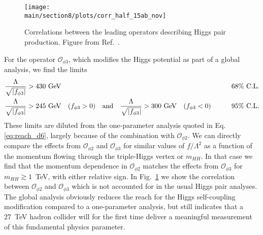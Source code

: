 \begin{figure}[t!]
\centering
\texttt{[image: \\main/section8/plots/corr\_half\_15ab\_nov]}
\caption{Correlations between the leading operators describing Higgs
  pair production. Figure from Ref.~\cite{Biekotter:2018jzu}.}
\label{fig:corr}
\end{figure}
For the operator $\mathcal{O}_{\phi 3}$, which modifies the Higgs potential
as part of a global analysis, we find the limits
%
\begin{alignat}{9}
\frac{\Lambda}{\sqrt{|f_{\phi 3}|}} &> 430~\text{GeV}
&\qquad \text{68\% C.L.} \notag \\
\frac{\Lambda}{\sqrt{|f_{\phi 3}|}} &> 245~\text{GeV}
\quad (f_{\phi 3} >0)
\quad \text{and} \quad 
\frac{\Lambda}{\sqrt{|f_{\phi 3}|}} > 300~\text{GeV}
\quad (f_{\phi 3} <0) 
&\qquad \text{95\% C.L.} 
\label{eq:reach_d6_3}
\end{alignat}
%
These limits are diluted from the one-parameter analysis quoted in
Eq.\eqref{eq:reach_d6}, largely because of the combination with
$\mathcal{O}_{\phi 2}$. We can directly compare the
effects from $\mathcal{O}_{\phi 2}$ and $\mathcal{O}_{\phi 3}$ for similar values of
$f/\Lambda^2$ as a function of the momentum flowing through the
triple-Higgs vertex or $m_{HH}$. In that case we find that the
momentum dependence in $\mathcal{O}_{\phi 2}$ matches the effects from
$\mathcal{O}_{\phi 3}$ for $m_{HH} \gtrsim 1$~TeV, with either relative
sign. 
In Fig.~\ref{fig:corr} we show 
the correlation between $\mathcal{O}_{\phi 2}$ and $\mathcal{O}_{\phi 3}$
which is not
accounted for in the usual Higgs pair analyses.
The global analysis obviously
reduces the reach for the Higgs self-coupling modification compared to
a one-parameter analysis, but still indicates that a 27~TeV hadron
collider will for the first time deliver a meaningful measurement of
this fundamental physics parameter. 

